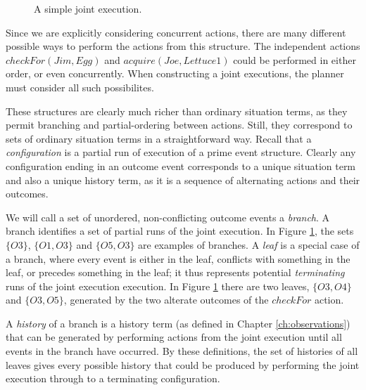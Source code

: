 %
\begin{figure}[t]

\caption{A simple joint execution.}


\label{fig:example-je} 
\end{figure}


Since we are explicitly considering concurrent actions, there are
many different possible ways to perform the actions from this structure.
The independent actions $checkFor(Jim,Egg)$ and $acquire(Joe,Lettuce1)$
could be performed in either order, or even concurrently. When constructing
a joint executions, the planner must consider all such possibilites.

These structures are clearly much richer than ordinary situation terms,
as they permit branching and partial-ordering between actions. Still,
they correspond to sets of ordinary situation terms in a straightforward
way. Recall that a \emph{configuration} is a partial run of execution
of a prime event structure. Clearly any configuration ending in an
outcome event corresponds to a unique situation term and also a unique
history term, as it is a sequence of alternating actions and their
outcomes.

We will call a set of unordered, non-conflicting outcome events a
\emph{branch}. A branch identifies a set of partial runs of the joint
execution. In Figure \ref{fig:example-je}, the sets $\{O3\}$, $\{O1,O3\}$
and $\{O5,O3\}$ are examples of branches. A \emph{leaf} is a special
case of a branch, where every event is either in the leaf, conflicts
with something in the leaf, or precedes something in the leaf; it
thus represents potential \emph{terminating} runs of the joint execution
execution. In Figure \ref{fig:example-je} there are two leaves, $\{O3,O4\}$
and $\{O3,O5\}$, generated by the two alterate outcomes of the $checkFor$
action.

A \emph{history} of a branch is a history term (as defined in Chapter
\ref{ch:observations}) that can be generated by performing actions
from the joint execution until all events in the branch have occurred.
By these definitions, the set of histories of all leaves gives every
possible history that could be produced by performing the joint execution
through to a terminating configuration.

